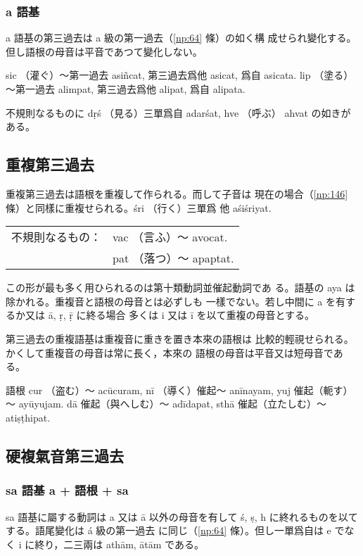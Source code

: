 \subsubsection{a 語基}
\numberParagraph
a 語基の第三過去は a 級の第一過去（\ref{np:64} 條）の如く構
成せられ變化する。但し語根の母音は平音であつて變化しない。

sic （灌ぐ）～第一過去 asiñcat, 第三過去爲他 asicat, 爲自
asicata. lip （塗る）～第一過去 alimpat, 第三過去爲他 alipat,
爲自 alipata.

不規則なるものに dṛś （見る）三單爲自 adarśat, hve （呼ぶ）
ahvat の如きがある。

\subsection{重複第三過去}
\numberParagraph
重複第三過去は語根を重複して作られる。而して子音は
現在の場合（\ref{np:146} 條）と同樣に重複せられる。śri （行く）三單爲
他 aśiśriyat.

\begin{tabular}{ll}
不規則なるもの： & vac （言ふ）～ avocat. \\
                 & pat （落つ）～ apaptat.
\end{tabular}

この形が最も多く用ひられるのは第十類動詞並催起動詞であ
る。語基の aya は除かれる。重複音と語根の母音とは必ずしも
一樣でない。若し中間に a を有するか又は ā, ṛ, ṝ に終る場合
多くは i 又は ī を以て重複の母音とする。

\numberParagraph
第三過去の重複語基は重複音に重きを置き本來の語根は
比較的輕視せられる。かくして重複音の母音は常に長く，本來の
語根の母音は平音又は短母音である。

語根 cur （盗む）～ acūcuram, nī （導く）催起～ anīnayam,
yuj 催起（軛す）～ ayūyujam. dā 催起（與へしむ）～ adīdapat,
sthā 催起（立たしむ）～ atiṣṭhipat.

\subsection{硬複氣音第三過去}
\subsubsection[sa 語基]{sa 語基 a + 語根 + sa}
\numberParagraph
sa 語基に屬する動詞は a 又は ā 以外の母音を有して
ś, ṣ, h に終れるものを以てする。語尾變化は á 級の第一過去
に同じ（\ref{np:64} 條）。但し一單爲自は e でなく i に終り，二三兩は
athām, ātām である。

